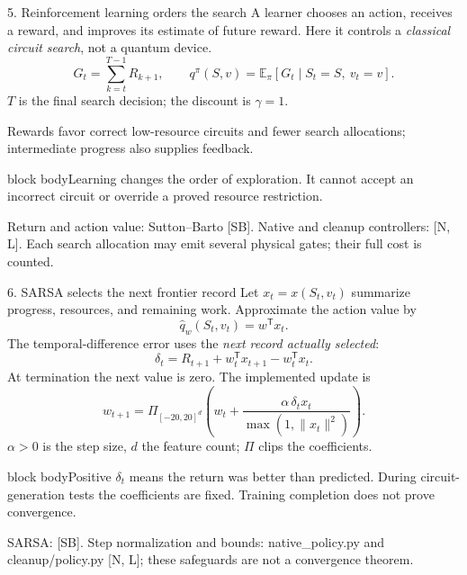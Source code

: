 \documentclass[aspectratio=169,11pt]{beamer}
\newcommand{\src}[1]{\par\vfill{\fontsize{6.6}{7.8}\selectfont\color{muted}#1\par}}
\newcommand{\takeaway}[1]{\par\smallskip\begin{beamercolorbox}[sep=1.4mm,wd=\linewidth]{block body}\small #1\end{beamercolorbox}}
\begin{document}
\begin{frame}[t]{5. Reinforcement learning orders the search}
\small
A learner chooses an action, receives a reward, and improves its estimate of future reward. Here it controls a \emph{classical circuit search}, not a quantum device.
\[
 G_t=\sum_{k=t}^{T-1}R_{k+1},
 \qquad q^\pi(S,v)=\mathbb E_\pi[G_t\mid S_t=S,\ v_t=v].
\]
$T$ is the final search decision; the discount is $\gamma=1$.
\begin{center}
\end{center}
Rewards favor correct low-resource circuits and fewer search allocations; intermediate progress also supplies feedback.
\takeaway{Learning changes the order of exploration. It cannot accept an incorrect circuit or override a proved resource restriction.}
\src{Return and action value: Sutton--Barto [SB]. Native and cleanup controllers: [N, L]. Each search allocation may emit several physical gates; their full cost is counted.}
\end{frame}

\begin{frame}[t]{6. SARSA selects the next frontier record}
\small
Let $x_t=x(S_t,v_t)$ summarize progress, resources, and remaining work. Approximate the action value by
\[
 \widehat q_w(S_t,v_t)=w^{\mathsf T}x_t.
\]
The temporal-difference error uses the \emph{next record actually selected}:
\[
 \delta_t=R_{t+1}+w_t^{\mathsf T}x_{t+1}-w_t^{\mathsf T}x_t.
\]
At termination the next value is zero. The implemented update is
\[
 w_{t+1}=\Pi_{[-20,20]^d}\!\left(
 w_t+\frac{\alpha\,\delta_t x_t}{\max(1,\|x_t\|^2)}\right).
\]
$\alpha>0$ is the step size, $d$ the feature count; $\Pi$ clips the coefficients.
\takeaway{Positive $\delta_t$ means the return was better than predicted. During circuit-generation tests the coefficients are fixed. Training completion does not prove convergence.}
\src{SARSA: [SB]. Step normalization and bounds: native\_policy.py and cleanup/policy.py [N, L]; these safeguards are not a convergence theorem.}
\end{frame}
\end{document}
